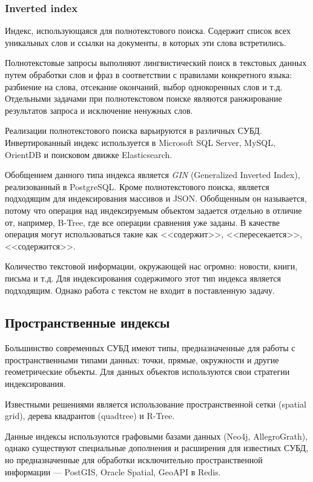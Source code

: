 \subsubsection{Inverted index}
Индекс, использующаяся для полнотекстового поиска. Содержит список всех уникальных слов и ссылки на документы, в которых эти слова встретились.

Полнотекстовые запросы выполняют лингвистический поиск в текстовых данных путем обработки слов и фраз в соответствии с правилами конкретного языка: разбиение на слова, отсекание окончаний, выбор однокоренных слов и т.д. Отдельными задачами при полнотекстовом поиске являются ранжирование результатов запроса и исключение ненужных слов.

Реализации полнотекстового поиска варьируются в различных СУБД. Инвертированный индекс используется в Microsoft SQL Server, MySQL, OrientDB и поисковом движке Elasticsearch.

Обобщением данного типа индекса является \textit{GIN} (Generalized Inverted Index),  реализованный в PostgreSQL.
Кроме полнотекстового поиска, является подходящим для индексирования массивов и JSON. Обобщенным он называется, потому что операция над индексируемым объектом задается отдельно в отличие от, например, B-Tree, где все операции сравнения уже заданы. В качестве операция могут использоваться такие как <<содержит>>, <<пересекается>>, <<содержится>>.

Количество текстовой информации, окружающей нас огромно: новости, книги, письма и т.д. Для индексирования содержимого этот тип индекса является подходящим. Однако работа с текстом не входит в поставленную задачу.

\subsection{Пространственные индексы}
Большинство современных СУБД имеют типы, предназначенные для работы с пространственными типами данных: точки, прямые, окружности и другие геометрические объекты. Для данных объектов используются свои стратегии индексирования.

Известными решениями является использование пространственной сетки (spatial grid), дерева квадрантов (quadtree) и R-Tree.

Данные индексы используются графовыми базами данных (Neo4j, AllegroGrath), однако существуют специальные дополнения и расширения для известных СУБД, но предназначенные для обработки исключительно пространственной информации --- PostGIS, Oracle Spatial, GeoAPI в Redis.


